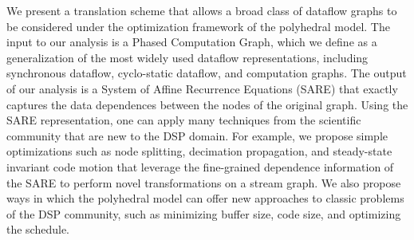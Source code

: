 We present a translation scheme that allows a broad class of dataflow
graphs to be considered under the optimization framework of the
polyhedral model.  The input to our analysis is a Phased Computation
Graph, which we define as a generalization of the most widely used
dataflow representations, including synchronous dataflow, cyclo-static
dataflow, and computation graphs.  The output of our analysis is a
System of Affine Recurrence Equations (SARE) that exactly captures the
data dependences between the nodes of the original graph.  Using the
SARE representation, one can apply many techniques from the scientific
community that are new to the DSP domain.  For example, we propose
simple optimizations such as node splitting, decimation propagation,
and steady-state invariant code motion that leverage the fine-grained
dependence information of the SARE to perform novel transformations on a
stream graph.  We also propose ways in which the polyhedral model can
offer new approaches to classic problems of the DSP community, such as
minimizing buffer size, code size, and optimizing the schedule.
